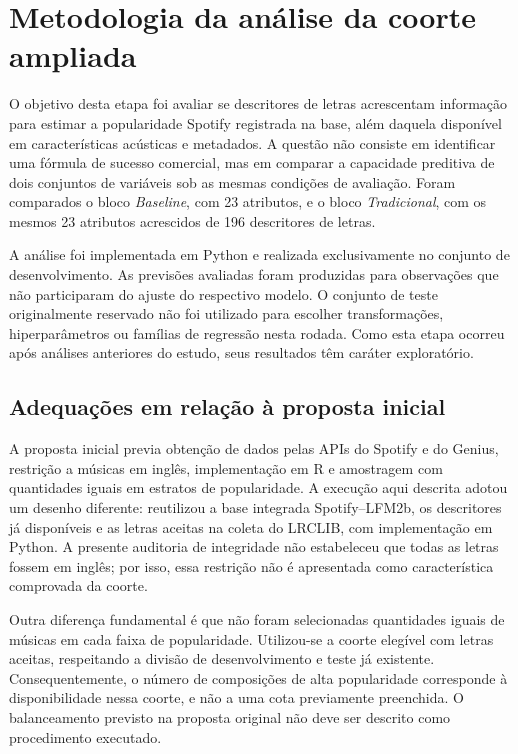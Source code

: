 \section{Metodologia da análise da coorte ampliada}
\label{sec:metodologia}

O objetivo desta etapa foi avaliar se descritores de letras acrescentam informação para estimar a popularidade Spotify registrada na base, além daquela disponível em características acústicas e metadados. A questão não consiste em identificar uma fórmula de sucesso comercial, mas em comparar a capacidade preditiva de dois conjuntos de variáveis sob as mesmas condições de avaliação. Foram comparados o bloco \textit{Baseline}, com 23 atributos, e o bloco \textit{Tradicional}, com os mesmos 23 atributos acrescidos de 196 descritores de letras.

A análise foi implementada em Python e realizada exclusivamente no conjunto de desenvolvimento. As previsões avaliadas foram produzidas para observações que não participaram do ajuste do respectivo modelo. O conjunto de teste originalmente reservado não foi utilizado para escolher transformações, hiperparâmetros ou famílias de regressão nesta rodada. Como esta etapa ocorreu após análises anteriores do estudo, seus resultados têm caráter exploratório.

\subsection{Adequações em relação à proposta inicial}

A proposta inicial previa obtenção de dados pelas APIs do Spotify e do Genius, restrição a músicas em inglês, implementação em R e amostragem com quantidades iguais em estratos de popularidade. A execução aqui descrita adotou um desenho diferente: reutilizou a base integrada Spotify--LFM2b, os descritores já disponíveis e as letras aceitas na coleta do LRCLIB, com implementação em Python. A presente auditoria de integridade não estabeleceu que todas as letras fossem em inglês; por isso, essa restrição não é apresentada como característica comprovada da coorte.

Outra diferença fundamental é que não foram selecionadas quantidades iguais de músicas em cada faixa de popularidade. Utilizou-se a coorte elegível com letras aceitas, respeitando a divisão de desenvolvimento e teste já existente. Consequentemente, o número de composições de alta popularidade corresponde à disponibilidade nessa coorte, e não a uma cota previamente preenchida. O balanceamento previsto na proposta original não deve ser descrito como procedimento executado.

